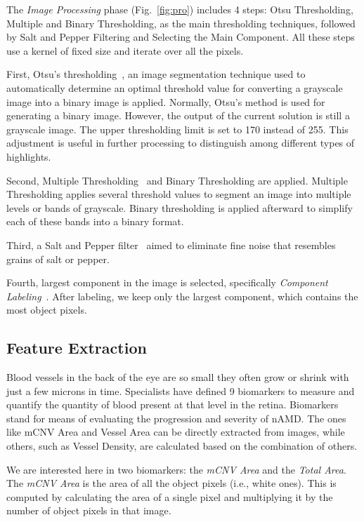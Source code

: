 \documentclass[conference]{IEEEtran}
\begin{document}
The \textit{Image Processing} phase (Fig.~\ref{fig:pro}) includes 4 steps: Otsu Thresholding, Multiple and Binary Thresholding, as the main thresholding techniques, followed by Salt and Pepper Filtering and Selecting the Main Component. 
All these steps use a kernel of fixed size and iterate over all the pixels.

First, Otsu's thresholding~\cite{khairnar2021effect}, an image segmentation technique used to automatically determine an optimal threshold value for converting a grayscale image into a binary image is applied. Normally, Otsu's method is used for generating a binary image. 
However, the output of the current solution is still a grayscale image. The upper thresholding limit is set to 170 instead of 255.
This adjustment is useful in further processing to distinguish among different types of highlights.

Second, Multiple Thresholding~\cite{mittal2018optimum} and Binary Thresholding are applied. 
Multiple Thresholding applies several threshold values to segment an image into multiple levels or bands of grayscale. 
Binary thresholding is applied afterward to simplify each of these bands into a binary format.

Third, a Salt and Pepper filter~\cite{thanh2020two} aimed to eliminate fine noise that resembles grains of salt or pepper.

Fourth, largest component in the image is selected, specifically \textit{Component Labeling}~\cite{safaei2022automatic}. After labeling, we keep only the largest component, which contains the most object pixels.


\subsection{Feature Extraction}
Blood vessels in the back of the eye are so small they often grow or shrink with just a few microns in time. Specialists have defined 9 biomarkers to measure and quantify the quantity of blood present at that level in the retina. 
Biomarkers stand for means of evaluating the progression and severity of nAMD. The ones like mCNV Area and Vessel Area can be directly extracted from images, while others, such as Vessel Density, are calculated based on the combination of others. 

We are interested here in two biomarkers: the \textit{mCNV Area} and the \textit{Total Area}. The \textit{mCNV Area} is the area of all the object pixels (i.e., white ones). This is computed by calculating the area of a single pixel and multiplying it by the number of object pixels in that image. 
\end{document}
